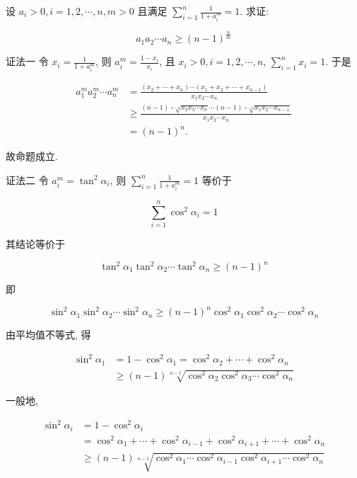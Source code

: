 \begin{example}
	设 $a_{i}>0, i=1,2, \cdots, n, m>0$ 且满足 $\sum_{i=1}^{n} \frac{1}{1+a_{i}^{m}}=1$. 求证:
	
	$$
	a_{1} a_{2} \cdots a_{n} \geqslant(n-1)^{\frac{n}{m}}
	$$
	
	证法一 令 $x_{i}=\frac{1}{1+a_{i}^{m}}$, 则 $a_{i}^{m}=\frac{1-x_{i}}{x_{i}}$, 且 $x_{i}>0, i=1,2, \cdots, n$, $\sum_{i=1}^{n} x_{i}=1$. 于是
	
	$$
	\begin{aligned}
	a_{1}^{m} a_{2}^{m} \cdots a_{n}^{m} & =\frac{\left(x_{2}+\cdots+x_{n}\right) \cdots\left(x_{1}+x_{2}+\cdots+x_{n-1}\right)}{x_{1} x_{2} \cdots x_{n}} \\
	& \geqslant \frac{(n-1) \sqrt[n-1]{x_{2} x_{3} \cdots x_{n}} \cdots(n-1) \sqrt[n-1]{x_{1} x_{2} \cdots x_{n-1}}}{x_{1} x_{2} \cdots x_{n}} \\
	& =(n-1)^{n} .
	\end{aligned}
	$$
	
	故命题成立.
	
	证法二 令 $a_{i}^{m}=\tan ^{2} \alpha_{i}$, 则 $\sum_{i=1}^{n} \frac{1}{1+a_{i}^{m}}=1$ 等价于
	
	$$
	\sum_{i=1}^{n} \cos ^{2} \alpha_{i}=1
	$$
	
	其结论等价于
	
	$$
	\tan ^{2} \alpha_{1} \tan ^{2} \alpha_{2} \cdots \tan ^{2} \alpha_{n} \geqslant(n-1)^{n}
	$$
	
	即
	
	$$
	\sin ^{2} \alpha_{1} \sin ^{2} \alpha_{2} \cdots \sin ^{2} \alpha_{n} \geqslant(n-1)^{n} \cos ^{2} \alpha_{1} \cos ^{2} \alpha_{2} \cdots \cos ^{2} \alpha_{n}
	$$
	
	由平均值不等式, 得
	
	$$
	\begin{aligned}
	\sin ^{2} \alpha_{1} & =1-\cos ^{2} \alpha_{1}=\cos ^{2} \alpha_{2}+\cdots+\cos ^{2} \alpha_{n} \\
	& \geqslant(n-1) \sqrt[n-1]{\cos ^{2} \alpha_{2} \cos ^{2} \alpha_{3} \cdots \cos ^{2} \alpha_{n}}
	\end{aligned}
	$$
	
	一般地,
	
	$$
	\begin{aligned}
	\sin ^{2} \alpha_{i} & =1-\cos ^{2} \alpha_{i} \\
	& =\cos ^{2} \alpha_{1}+\cdots+\cos ^{2} \alpha_{i-1}+\cos ^{2} \alpha_{i+1}+\cdots+\cos ^{2} \alpha_{n} \\
	& \geqslant(n-1) \sqrt[n-1]{\cos ^{2} \alpha_{1} \cdots \cos ^{2} \alpha_{i-1} \cos ^{2} \alpha_{i+1} \cdots \cos ^{2} \alpha_{n}}
	\end{aligned}
	$$
	

\end{example}
